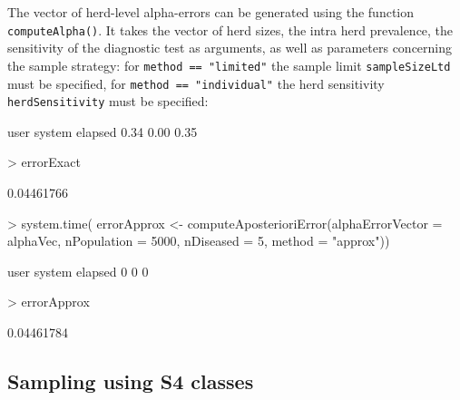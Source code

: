\documentclass[nojss]{jss}
\begin{document}
The vector of herd-level alpha-errors can be generated using the 
function \texttt{computeAlpha()}.  It 
takes the vector of herd sizes, the intra herd prevalence, the 
sensitivity of the diagnostic test as arguments, as well as 
parameters concerning the sample strategy: for \texttt{method == 
"limited"} the sample limit \texttt{sampleSizeLtd} must be 
specified, for \texttt{method == "individual"} the herd sensitivity 
\texttt{herdSensitivity} must be specified:

\begin{Schunk}
\begin{Soutput}
   user  system elapsed 
   0.34    0.00    0.35 
\end{Soutput}
\begin{Sinput}
> errorExact    
\end{Sinput}
\begin{Soutput}
[1] 0.04461766
\end{Soutput}
\begin{Sinput}
> system.time({
   errorApprox <- computeAposterioriError(alphaErrorVector = alphaVec, 
       nPopulation = 5000, nDiseased = 5, method = "approx")})
\end{Sinput}
\begin{Soutput}
   user  system elapsed 
      0       0       0 
\end{Soutput}
\begin{Sinput}
> errorApprox
\end{Sinput}
\begin{Soutput}
[1] 0.04461784
\end{Soutput}
\end{Schunk}



\subsection{Sampling using S4 classes} 
\label{subsec:sampling_with_class}
\end{document}
